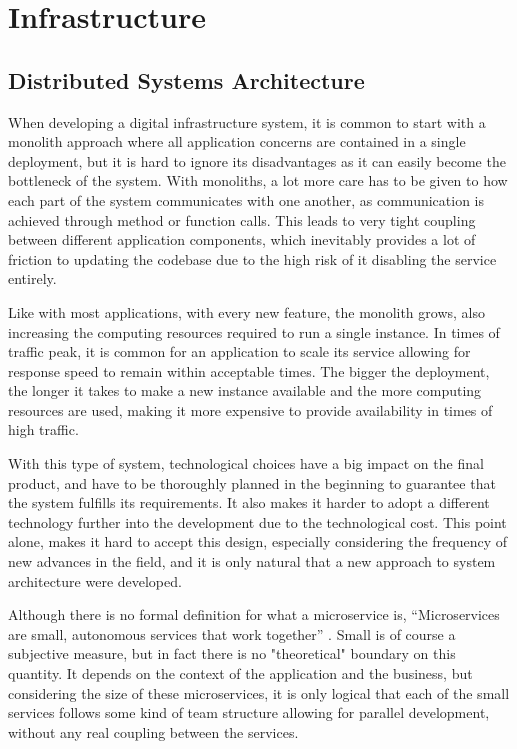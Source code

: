 \chapter{Infrastructure} 
\label{chap:infrastructure}

\section{Distributed Systems Architecture}

When developing a digital infrastructure system, it is common to start with a
monolith approach where all application concerns are contained in a single
deployment, but it is hard to ignore its disadvantages as it can easily become
the bottleneck of the system. With monoliths, a lot more care has to be given to
how each part of the system communicates with one another, as communication is
achieved through method or function calls. This leads to very tight coupling
between different application components, which inevitably provides a lot of
friction to updating the codebase due to the high risk of it disabling the
service entirely.

Like with most applications, with every new feature, the monolith grows, also
increasing the computing resources required to run a single instance. In times
of traffic peak, it is common for an application to scale its service allowing
for response speed to remain within acceptable times. The bigger the deployment,
the longer it takes to make a new instance available and the more computing
resources are used, making it more expensive to provide availability in times of
high traffic.

With this type of system, technological choices have a big impact on the final
product, and have to be thoroughly planned in the beginning to guarantee that
the system fulfills its requirements. It also makes it harder to adopt a
different technology further into the development due to the technological cost.
This point alone, makes it hard to accept this design, especially considering
the frequency of new advances in the field, and it is only natural that a new
approach to system architecture were developed.

Although there is no formal definition for what a microservice is,
``Microservices are small, autonomous services that work together''
\cite[Chapter~1]{newman2015building}. Small is of course a subjective measure,
but in fact there is no "theoretical" boundary on this quantity. It depends on
the context of the application and the business, but considering the size of
these microservices, it is only logical that each of the small services follows
some kind of team structure allowing for parallel development, without any real
coupling between the services. 

